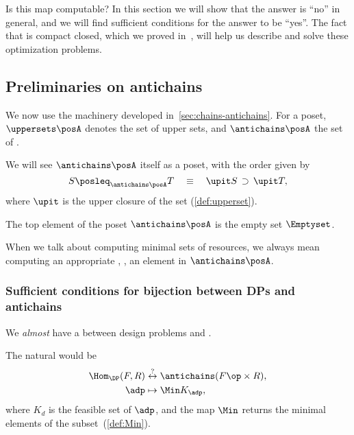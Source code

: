 Is this map computable?
In this section we will show that the answer is ``no'' in general, and we will find sufficient conditions for the answer to be ``yes''.
The fact that \DP is compact closed, which we proved in~\XXX, will help us describe and solve these optimization problems.

\subsection{Preliminaries on antichains}

We now use the   machinery developed in~\cref{sec:chains-antichains}.
For \posA a poset, $\uppersets \posA$ denotes the set of upper sets, and $\antichains \posA$ the set of .


We will see $\antichains \posA$ itself as a poset, with the order given by
\begin{equation}
    S \posleq_{\antichains \posA} T  \quad \equiv \quad\upit S\, \supset\,\upit T,
\end{equation}
where $\upit$ is the upper closure of the set (\cref{def:upperset}).

The top element of the poset $\antichains\posA$ is the empty set $\Emptyset$.

When we talk about computing minimal sets of resources, we always mean computing an appropriate , \ie, an element in $\antichains \posA$.

\subsubsection{Sufficient conditions for bijection between DPs and antichains }

We \emph{almost} have a  between design problems and .

The natural  would be
\begin{equation}
    \begin{aligned}
        \Hom_\DP(F,R) & \overset{?
        }{\leftrightarrow} \antichains (F\op \times R), \\
        \adp          & \mapsto \Min K_\adp,
    \end{aligned}
\end{equation}
where $K_d$ is the feasible set of $\adp$,
and the map $\Min$ returns the minimal elements of the subset~(\cref{def:Min}).

